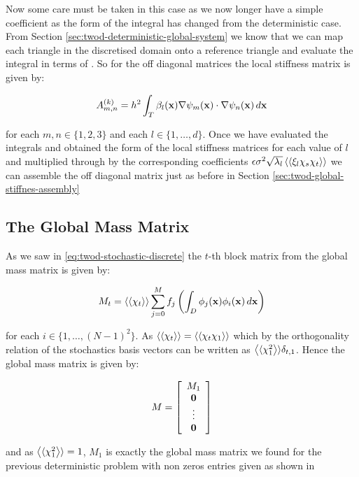 Now some care must be taken in this case as we now longer have a simple
coefficient as the form of the integral has changed from the deterministic
case. From Section \ref{sec:twod-deterministic-global-system} we know that we
can map each triangle in the discretised domain onto a reference triangle and
evaluate the integral in terms of . So for the off
diagonal matrices the local stiffness matrix is given by:

\begin{equation}
    A^{(k)}_{m,n} =
    h^2\int_T\beta_l(\mathbf{x})\nabla\psi_m(\mathbf{x})\cdot\nabla\psi_n(\mathbf{x})\, d\mathbf{x}
\end{equation}

for each $m, n \in \{1, 2, 3\}$ and each $l \in \{1, \ldots, d\}$. Once we have
evaluated the integrals and obtained the form of the local stiffness matrices
for each value of $l$ and multiplied through by the corresponding coefficients
$\epsilon\sigma^2\sqrt{\lambda_l}\left\langle\langle\xi_l\chi_s\chi_t\right\rangle\rangle$ we can assemble
the off diagonal matrix just as before in Section
\ref{sec:twod-global-stiffnes-assembly}

\subsection{The Global Mass Matrix}

As we saw in \ref{eq:twod-stochastic-discrete} the $t$-th block matrix from the
global mass matrix is given by:

\begin{equation}
    M_t = \left\langle\langle\chi_t\right\rangle\rangle\sum_{j=0}^Mf_j
    \left(\int_D\phi_j(\mathbf{x})\phi_i(\mathbf{x})\, d\mathbf{x}\right)
\end{equation}

for each $i \in \{1, \ldots, (N-1)^2\}$. As $\left\langle\langle\chi_t\right\rangle\rangle =
\left\langle\langle\chi_t\chi_1\right\rangle\rangle$ which by the orthogonality relation of the stochastics basis
vectors can be written as $\left\langle\langle\chi_1^2\right\rangle\rangle\delta_{t,1}$. Hence the global
mass matrix is given by:

\begin{equation}
    M = \left[\begin{array}{c}
            M_1 \\ \mathbf{0} \\ \vdots \\ \mathbf{0}
    \end{array}\right]
\end{equation}

and as $\left\langle\langle\chi_1^2\right\rangle\rangle = 1$, $M_1$ is exactly the global mass matrix we found
for the previous deterministic problem with non zeros entries given as shown in


